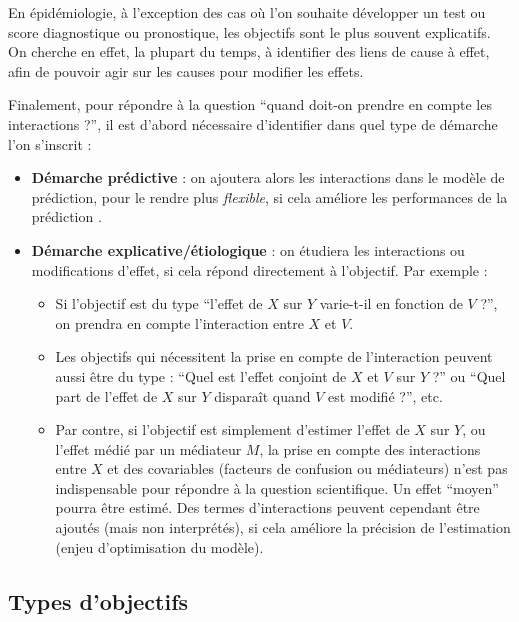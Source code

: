 \documentclass[
]{book}
\providecommand{\tightlist}{%
  \setlength{\itemsep}{0pt}\setlength{\parskip}{0pt}}
\begin{document}
En épidémiologie, à l'exception des cas où l'on souhaite développer un test ou score diagnostique ou pronostique, les objectifs sont le plus souvent explicatifs. On cherche en effet, la plupart du temps, à identifier des liens de cause à effet, afin de pouvoir agir sur les causes pour modifier les effets.

Finalement, pour répondre à la question ``quand doit-on prendre en compte les interactions ?'', il est d'abord nécessaire d'identifier dans quel type de démarche l'on s'inscrit :

\begin{itemize}
\tightlist
\item
  \textbf{Démarche prédictive} : on ajoutera alors les interactions dans le modèle de prédiction, pour le rendre plus \emph{flexible}, si cela améliore les performances de la prédiction \citet{vanderweele_tutorial_2014}.
\item
  \textbf{Démarche explicative/étiologique} : on étudiera les interactions ou modifications d'effet, si cela répond directement à l'objectif. Par exemple :

  \begin{itemize}
  \tightlist
  \item
    Si l'objectif est du type ``l'effet de \(X\) sur \(Y\) varie-t-il en fonction de \(V\) ?'', on prendra en compte l'interaction entre \(X\) et \(V\).
  \item
    Les objectifs qui nécessitent la prise en compte de l'interaction peuvent aussi être du type : ``Quel est l'effet conjoint de \(X\) et \(V\) sur \(Y\) ?'' ou ``Quel part de l'effet de \(X\) sur \(Y\) disparaît quand \(V\) est modifié ?'', etc.
  \item
    Par contre, si l'objectif est simplement d'estimer l'effet de \(X\) sur \(Y\), ou l'effet médié par un médiateur \(M\), la prise en compte des interactions entre \(X\) et des covariables (facteurs de confusion ou médiateurs) n'est pas indispensable pour répondre à la question scientifique. Un effet ``moyen'' pourra être estimé. Des termes d'interactions peuvent cependant être ajoutés (mais non interprétés), si cela améliore la précision de l'estimation (enjeu d'optimisation du modèle).
  \end{itemize}
\end{itemize}

\hypertarget{types-dobjectifs}{%
\subsection{Types d'objectifs}\label{types-dobjectifs}}
\end{document}
